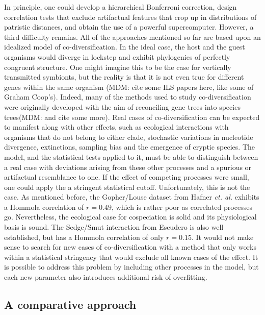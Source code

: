 In principle, one could develop a hierarchical Bonferroni correction, design correlation tests that exclude artifactual features that crop up in distributions of patristic distances, and obtain the use of a powerful supercomputer. However, a third difficulty remains. All of the approaches mentioned so far are based upon an idealized model of co-diversification. In the ideal case, the host and the guest organisms would diverge in lockstep and exhibit phylogenies of perfectly congruent structure. One might imagine this to be the case for vertically transmitted symbionts, but the reality is that it is not even true for different genes within the same organism (MDM: cite some ILS papers here, like some of Graham Coop's). Indeed, many of the methods used to study co-diversification were originally developed with the aim of reconciling gene trees into species trees(MDM: and cite some more). Real cases of co-diversification can be expected to manifest along with other effects, such as ecological interactions with organisms that do not belong to either clade, stochastic variations in nucleotide divergence, extinctions, sampling bias and the emergence of cryptic species. The model, and the statistical tests applied to it, must be able to distinguish between a real case with deviations arising from these other processes and a spurious or artifactual resemblance to one. If the effect of competing processes were small, one could apply the a stringent statistical cutoff. Unfortunately, this is not the case. As mentioned before, the Gopher/Louse dataset from Hafner {\em et. al.} exhibits a Hommola correlation of $r=0.49$, which is rather poor as correlated processes go. Nevertheless, the ecological case for cospeciation is solid and its physiological basis is sound. The Sedge/Smut interaction from Escudero \cite{escudero2015phylogenetic} is also well established, but has a Hommola correlation of only $r=0.15$. It would not make sense to search for new cases of co-diversification with a method that only works within a statistical stringency that would exclude all known cases of the effect. It is possible to address this problem by including other processes in the model, but each new parameter also introduces additional risk of overfitting.

\subsection{A comparative approach}

